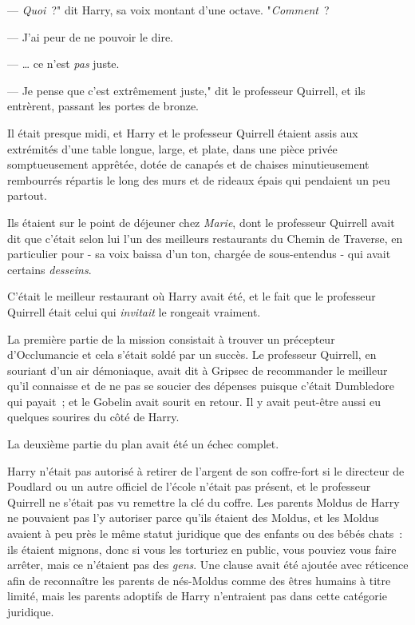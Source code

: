 --- \emph{Quoi}~?" dit Harry, sa voix montant d'une octave. "\emph{Comment}~?

--- J'ai peur de ne pouvoir le dire.

--- … ce n'est \emph{pas} juste.

--- Je pense que c'est extrêmement juste," dit le professeur Quirrell, et ils entrèrent, passant les portes de bronze.

\later

Il était presque midi, et Harry et le professeur Quirrell étaient assis aux extrémités d'une table longue, large, et plate, dans une pièce privée somptueusement apprêtée, dotée de canapés et de chaises minutieusement rembourrés répartis le long des murs et de rideaux épais qui pendaient un peu partout.

Ils étaient sur le point de déjeuner chez \emph{Marie}, dont le professeur Quirrell avait dit que c'était selon lui l'un des meilleurs restaurants du Chemin de Traverse, en particulier pour - sa voix baissa d'un ton, chargée de sous-entendus - qui avait certains \emph{desseins}.

C'était le meilleur restaurant où Harry avait été, et le fait que le professeur Quirrell était celui qui \emph{invitait} le rongeait vraiment.

La première partie de la mission consistait à trouver un précepteur d'Occlumancie et cela s'était soldé par un succès. Le professeur Quirrell, en souriant d'un air démoniaque, avait dit à Gripsec de recommander le meilleur qu'il connaisse et de ne pas se soucier des dépenses puisque c'était Dumbledore qui payait~; et le Gobelin avait sourit en retour. Il y avait peut-être aussi eu quelques sourires du côté de Harry.

La deuxième partie du plan avait été un échec complet.

Harry n'était pas autorisé à retirer de l'argent de son coffre-fort si le directeur de Poudlard ou un autre officiel de l'école n'était pas présent, et le professeur Quirrell ne s'était pas vu remettre la clé du coffre. Les parents Moldus de Harry ne pouvaient pas l'y autoriser parce qu'ils étaient des Moldus, et les Moldus avaient à peu près le même statut juridique que des enfants ou des bébés chats~: ils étaient mignons, donc si vous les torturiez en public, vous pouviez vous faire arrêter, mais ce n'étaient pas des \emph{gens}. Une clause avait été ajoutée avec réticence afin de reconnaître les parents de nés-Moldus comme des êtres humains à titre limité, mais les parents adoptifs de Harry n'entraient pas dans cette catégorie juridique.


